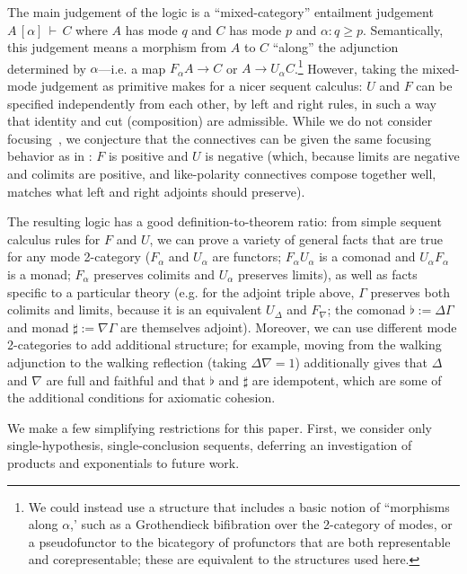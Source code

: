 \documentclass{drl-common/llncs}
\newcommand\seq[3]{\ensuremath{#1 \, [ #2 ] \, \vdash \, #3}}
\begin{document}
The main judgement of the logic is a ``mixed-category'' entailment
judgement \seq{A}{\alpha}{C} where $A$ has mode $q$ and $C$ has mode $p$
and $\alpha : q \ge p$.  Semantically, this judgement means a morphism
from $A$ to $C$ ``along'' the adjunction determined by $\alpha$---i.e. a
map $F_\alpha A \to C$ or $A \to U_\alpha C$.\footnote{We could instead
  use a structure that includes a basic notion of ``morphisms along
  $\alpha$,' such as a Grothendieck bifibration over the 2-category of
  modes, or a pseudofunctor to the bicategory of profunctors that are
  both representable and corepresentable; these are equivalent to the
  structures used here.}  However, taking the mixed-mode judgement as
primitive makes for a nicer sequent calculus: $U$ and $F$ can be
specified independently from each other, by left and right rules, in
such a way that identity and cut (composition) are admissible.  While we
do not consider focusing~\citep{andreoli92focus}, we conjecture that the
connectives can be given the same focusing behavior as in
\citep{reed09adjoint}: $F$ is positive and $U$ is negative (which,
because limits are negative and colimits are positive, and like-polarity
connectives compose together well, matches what left and right adjoints
should preserve).

The resulting logic has a good definition-to-theorem ratio: from 
simple sequent calculus rules for $F$ and $U$, we can prove a variety of
general facts that are true for any mode 2-category ($F_\alpha$ and
$U_\alpha$ are functors; $F_\alpha U_\alpha$ is a comonad and $U_\alpha
F_\alpha$ is a monad; $F_\alpha$ preserves colimits and $U_\alpha$
preserves limits), as well as facts specific to a particular theory
(e.g. for the adjoint triple above, $\Gamma$ preserves both colimits
and limits, because it is an equivalent $U_\Delta$ and $F_\nabla$; the
comonad $\flat := \Delta\Gamma$ and monad $\sharp := \nabla\Gamma$ are
themselves adjoint).  Moreover, we can use different mode 2-categories
to add additional structure; for example, moving from the walking
adjunction to the walking reflection (taking $\Delta \nabla = 1$)
additionally gives that $\Delta$ and $\nabla$ are full and faithful and
that $\flat$ and $\sharp$ are idempotent, which are some of the
additional conditions for axiomatic cohesion.

We make a few simplifying restrictions for this paper. First, we
consider only single-hypothesis, single-conclusion sequents, deferring
an investigation of products and exponentials to future work.
\end{document}
